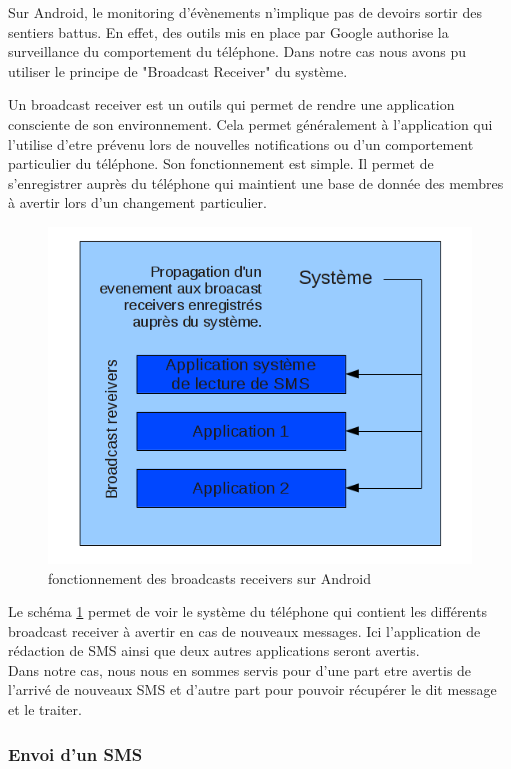 Sur Android, le monitoring d'évènements n'implique pas de devoirs sortir des sentiers battus. En effet,
des outils mis en place par Google authorise la surveillance du comportement du téléphone. Dans notre cas 
nous avons pu utiliser le principe de "Broadcast Receiver" du système. 

Un broadcast receiver est un outils qui permet de rendre une application consciente de son environnement.
Cela permet généralement à l'application qui l'utilise d'etre prévenu lors de nouvelles notifications ou 
d'un comportement particulier du téléphone.
Son fonctionnement est simple. Il permet de s'enregistrer auprès du téléphone qui maintient une base de donnée des 
membres à avertir lors d'un changement particulier.

\begin{figure}[!h]
	\center
	\includegraphics[width=12cm]{img/broadcast-receivers.png}
	\caption{fonctionnement des broadcasts receivers sur Android}
	\label{broadcast-receivers}
\end{figure}

Le schéma \ref{broadcast-receivers} permet de voir le système du téléphone qui contient les différents broadcast 
receiver à avertir en cas de nouveaux messages. Ici l'application de rédaction de SMS ainsi que deux autres 
applications seront avertis.
\\
Dans notre cas, nous nous en sommes servis pour d'une part etre avertis de l'arrivé de nouveaux SMS et d'autre 
part pour pouvoir récupérer le dit message et le traiter.
\\


\subsubsection{Envoi d'un SMS}

